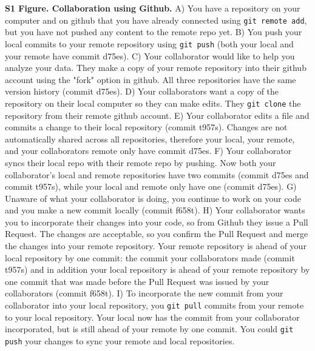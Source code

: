 \textbf{S1 Figure. Collaboration using Github.}
A) You have a repository on your computer and on github that you have already connected using \verb|git remote add|, but you have not pushed any content to the remote repo yet.
B) You push your local commits to your remote repository using \verb|git push| (both your local and your remote have commit d75es).
C) Your collaborator would like to help you analyze your data.
They make a copy of your remote repository into their github account using the "fork" option in github.
All three repositories have the same version history (commit d75es).
D) Your collaborators want a copy of the repository on their local computer so they can make edits.
They \verb|git clone| the repository from their remote github account.
E) Your collaborator edits a file and commits a change to their local repository (commit t957s).
Changes are not automatically shared across all repositories, therefore your local, your remote, and your collaborators remote only have commit d75es.
F) Your collaborator syncs their local repo with their remote repo by pushing.
Now both your collaborator's local and remote repositories have two commits (commit d75es and commit t957s), while your local and remote only have one (commit d75es).
G) Unaware of what your collaborator is doing, you continue to work on your code and you make a new commit locally (commit f658t).
H) Your collaborator wants you to incorporate their changes into your code, so from Github they issue a Pull Request.
The changes are acceptable, so you confirm the Pull Request and merge the changes into your remote repository.
Your remote repository is ahead of your local repository by one commit: the commit your collaborators made (commit t957s) and in addition your local repository is ahead of your remote repository by one commit that was made before the Pull Request was issued by your collaborators (commit f658t).
I) To incorporate the new commit from your collaborator into your local repository, you \verb|git pull| commits from your remote to your local repository.
Your local now has the commit from your collaborator incorporated, but is still ahead of your remote by one commit.
You could \verb|git push| your changes to sync your remote and local repositories.
